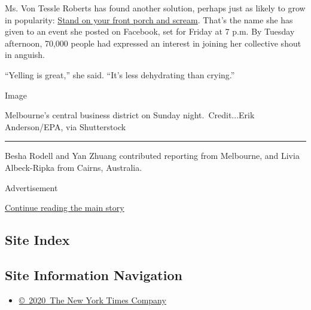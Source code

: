 Ms. Von Tessle Roberts has found another solution, perhaps just as
likely to grow in popularity:
\href{https://www.facebook.com/events/2738223623055680/}{Stand on your
front porch and scream}. That's the name she has given to an event she
posted on Facebook, set for Friday at 7 p.m. By Tuesday afternoon,
70,000 people had expressed an interest in joining her collective shout
in anguish.

``Yelling is great,'' she said. ``It's less dehydrating than crying.''

Image

Melbourne's central business district on Sunday night.~Credit...Erik
Anderson/EPA, via Shutterstock

\begin{center}\rule{0.5\linewidth}{\linethickness}\end{center}

Besha Rodell and Yan Zhuang contributed reporting from Melbourne, and
Livia Albeck-Ripka from Cairns, Australia.

Advertisement

\protect\hyperlink{after-bottom}{Continue reading the main story}

\hypertarget{site-index}{%
\subsection{Site Index}\label{site-index}}

\hypertarget{site-information-navigation}{%
\subsection{Site Information
Navigation}\label{site-information-navigation}}

\begin{itemize}
\tightlist
\item
  \href{https://help.nytimes.com/hc/en-us/articles/115014792127-Copyright-notice}{©~2020~The
  New York Times Company}
\end{itemize}

